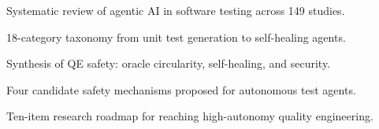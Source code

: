 \begin{highlights}
\item Systematic review of agentic AI in software testing across 149 studies.
\item 18-category taxonomy from unit test generation to self-healing agents.
\item Synthesis of QE safety: oracle circularity, self-healing, and security.
\item Four candidate safety mechanisms proposed for autonomous test agents.
\item Ten-item research roadmap for reaching high-autonomy quality engineering.
\end{highlights}

